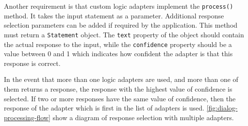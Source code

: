 \documentclass[12pt,a4paper]{article}
\newcommand{\captionstyle}[1] {
    \small{#1}
}
\begin{document}
Another requirement is that custom logic adapters implement the \texttt{process()} method. It takes the input statement as a parameter. Additional response selection parameters can be added if required by the application. 
%
%
%
%
This method must return a \texttt{Statement} object. The \texttt{text} property of the object should contain the actual response to the input, while the \texttt{confidence} property should be a value between 0 and 1 which indicates how confident the adapter is that this response is correct. 


In the event that more than one logic adapters are used, and more than one of them returns a response, the response with the highest value of confidence is selected. If two or more responses have the same value of confidence, then the response of the adapter which is first in the list of adapters is used. \cref{fig:dialog-processing-flow} show a diagram of response selection with multiple adapters.
\end{document}
